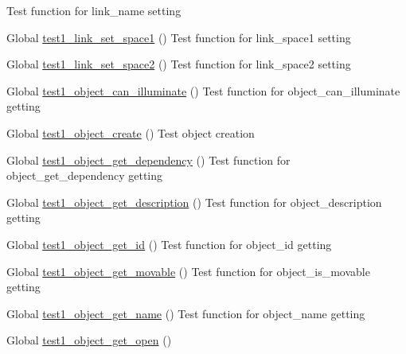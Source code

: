 \begin{DoxyRefList}
%
Test function for link\+\_\+name setting  
\item[Global \mbox{\hyperlink{link__test_8c_a43deab7f0799cbd09d8d27c21bbb4a6c}{test1\+\_\+link\+\_\+set\+\_\+space1}} ()]\label{test__test000078}%
%
Test function for link\+\_\+space1 setting  
\item[Global \mbox{\hyperlink{link__test_8c_a1cafd7495574bc7d852c9f4f7eeb14ac}{test1\+\_\+link\+\_\+set\+\_\+space2}} ()]\label{test__test000081}%
%
Test function for link\+\_\+space2 setting  
\item[Global \mbox{\hyperlink{object__test_8h_a96cf074280979a66e0fb8be81a362c15}{test1\+\_\+object\+\_\+can\+\_\+illuminate}} ()]\label{test__test000116}%
%
Test function for object\+\_\+can\+\_\+illuminate getting  
\item[Global \mbox{\hyperlink{object__test_8h_a3836d69f92ce7149d56bafcaec83f516}{test1\+\_\+object\+\_\+create}} ()]\label{test__test000096}%
%
Test object creation  
\item[Global \mbox{\hyperlink{object__test_8h_aff882e9769d27a86bd3ede47c1be29d4}{test1\+\_\+object\+\_\+get\+\_\+dependency}} ()]\label{test__test000124}%
%
Test function for object\+\_\+get\+\_\+dependency getting  
\item[Global \mbox{\hyperlink{object__test_8h_afe180b78a201df7bc1629701db1d464c}{test1\+\_\+object\+\_\+get\+\_\+description}} ()]\label{test__test000108}%
%
Test function for object\+\_\+description getting  
\item[Global \mbox{\hyperlink{object__test_8h_aa88e9e9dab92ba9c58851d7a7a8415f0}{test1\+\_\+object\+\_\+get\+\_\+id}} ()]\label{test__test000098}%
%
Test function for object\+\_\+id getting  
\item[Global \mbox{\hyperlink{object__test_8h_a28605c20187056beac0c0e12a2a39fc3}{test1\+\_\+object\+\_\+get\+\_\+movable}} ()]\label{test__test000112}%
%
Test function for object\+\_\+is\+\_\+movable getting  
\item[Global \mbox{\hyperlink{object__test_8h_ad2411bc3cc47c9905e63a3d9c561d369}{test1\+\_\+object\+\_\+get\+\_\+name}} ()]\label{test__test000103}%
%
Test function for object\+\_\+name getting  
\item[Global \mbox{\hyperlink{object__test_8h_ab767449f517f5a5b4ee790cd15bd4d77}{test1\+\_\+object\+\_\+get\+\_\+open}} ()]\label{test__test000128}%

\end{DoxyRefList}

